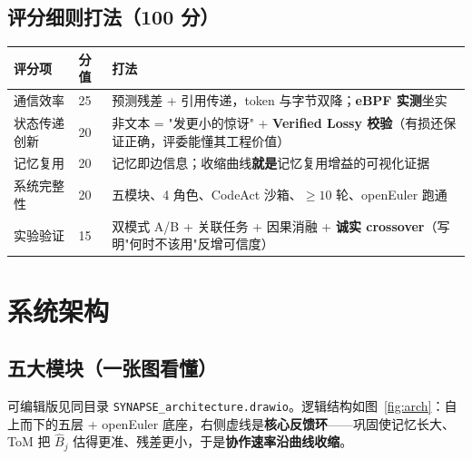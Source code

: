 \documentclass[UTF8,fontset=windows,11pt]{ctexart}
\begin{document}
\subsection{评分细则打法（100 分）}
\begin{table}[h]\small\centering
\renewcommand{\arraystretch}{1.25}
\begin{tabularx}{\linewidth}{@{}p{2.6cm}p{1.0cm}Y@{}}
\toprule
\textbf{评分项} & \textbf{分值} & \textbf{打法} \\
\midrule
通信效率 & 25 & 预测残差 + 引用传递，token 与字节双降；\textbf{eBPF 实测}坐实 \\
状态传递创新 & 20 & 非文本 = "发更小的惊讶" + \textbf{Verified Lossy 校验}（有损还保证正确，评委能懂其工程价值） \\
记忆复用 & 20 & 记忆即边信息；收缩曲线\textbf{就是}记忆复用增益的可视化证据 \\
系统完整性 & 20 & 五模块、4 角色、CodeAct 沙箱、$\ge 10$ 轮、openEuler 跑通 \\
实验验证 & 15 & 双模式 A/B + 关联任务 + 因果消融 + \textbf{诚实 crossover}（写明"何时不该用"反增可信度） \\
\bottomrule
\end{tabularx}
\end{table}

\section{系统架构}

\subsection{五大模块（一张图看懂）}
可编辑版见同目录 \texttt{SYNAPSE\_architecture.drawio}。逻辑结构如图~\ref{fig:arch}：自上而下的五层 + openEuler 底座，右侧虚线是\textbf{核心反馈环}——巩固使记忆长大、ToM 把 $\hat B_j$ 估得更准、残差更小，于是\textbf{协作速率沿曲线收缩}。
\end{document}
